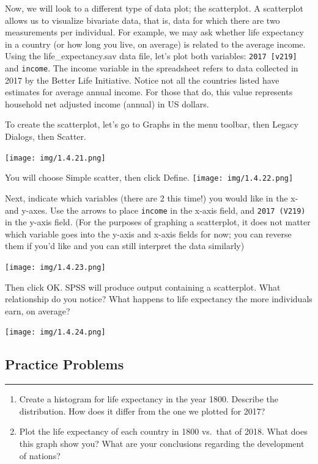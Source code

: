 \documentclass[]{book}
\begin{document}
Now, we will look to a different type of data plot; the scatterplot. A
scatterplot allows us to visualize bivariate data, that is, data for
which there are two measurements per individual. For example, we may ask
whether life expectancy in a country (or how long you live, on average)
is related to the average income. Using the life\_expectancy.sav data
file, let's plot both variables: \texttt{2017\ {[}v219{]}} and
\texttt{income}. The income variable in the spreadsheet refers to data
collected in 2017 by the Better Life Initiative. Notice not all the
countries listed have estimates for average annual income. For those
that do, this value represents household net adjusted income (annual) in
US dollars.

To create the scatterplot, let's go to {Graphs} in the menu toolbar,
then {Legacy Dialogs}, then {Scatter}.

\texttt{[image: img/1.4.21.png]}

You will choose {Simple} scatter, then click {Define}.
\texttt{[image: img/1.4.22.png]}

Next, indicate which variables (there are 2 this time!) you would like
in the x- and y-axes. Use the arrows to place \texttt{income} in the
x-axis field, and \texttt{2017\ (V219)} in the y-axis field. (For the
purposes of graphing a scatterplot, it does not matter which variable
goes into the y-axis and x-axis fields for now; you can reverse them if
you'd like and you can still interpret the data similarly)

\texttt{[image: img/1.4.23.png]}

Then click {OK}. SPSS will produce output containing a scatterplot. What
relationship do you notice? What happens to life expectancy the more
individuals earn, on average?

\texttt{[image: img/1.4.24.png]}

\subsection{Practice Problems}\label{practice-problems}

\begin{center}\rule{0.5\linewidth}{0.5pt}\end{center}

\begin{enumerate}
\def\labelenumi{\arabic{enumi}.}
\item
  Create a histogram for life expectancy in the year 1800. Describe the
  distribution. How does it differ from the one we plotted for 2017?
\item
  Plot the life expectancy of each country in 1800 vs.~that of 2018.
  What does this graph show you? What are your conclusions regarding the
  development of nations?
\end{enumerate}
\end{document}

